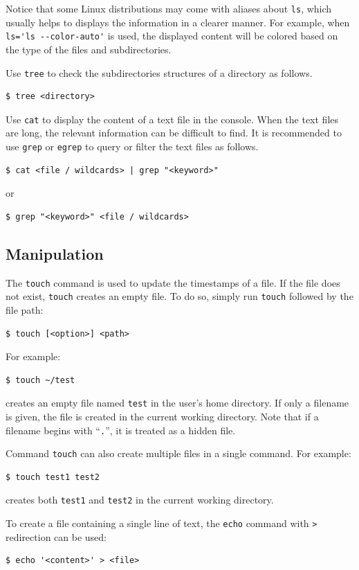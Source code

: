 Notice that some Linux distributions may come with aliases about \verb|ls|, which usually helps to displays the information in a clearer manner. For example, when \verb|ls='ls --color-auto'| is used, the displayed content will be colored based on the type of the files and subdirectories.

Use \verb|tree| to check the subdirectories structures of a directory as follows.
\begin{lstlisting}
$ tree <directory>
\end{lstlisting}

Use \verb|cat| to display the content of a text file in the console. When the text files are long, the relevant information can be difficult to find. It is recommended to use \verb|grep| or \verb|egrep| to query or filter the text files as follows.
\begin{lstlisting}
$ cat <file / wildcards> | grep "<keyword>"
\end{lstlisting}
or
\begin{lstlisting}
$ grep "<keyword>" <file / wildcards>
\end{lstlisting}

\subsection{Manipulation}

The \verb|touch| command is used to update the timestamps of a file. If the file does not exist, \verb|touch| creates an empty file. To do so, simply run \verb|touch| followed by the file path:
\begin{lstlisting}
$ touch [<option>] <path>
\end{lstlisting}

For example:
\begin{lstlisting}
$ touch ~/test
\end{lstlisting}
creates an empty file named \texttt{test} in the user’s home directory. If only a filename is given, the file is created in the current working directory. Note that if a filename begins with ``\verb|.|'', it is treated as a hidden file.

Command \verb|touch| can also create multiple files in a single command. For example:
\begin{lstlisting}
$ touch test1 test2
\end{lstlisting}
creates both \texttt{test1} and \texttt{test2} in the current working directory.

To create a file containing a single line of text, the \verb|echo| command with \verb|>| redirection can be used:
\begin{lstlisting}
$ echo '<content>' > <file>
\end{lstlisting}


